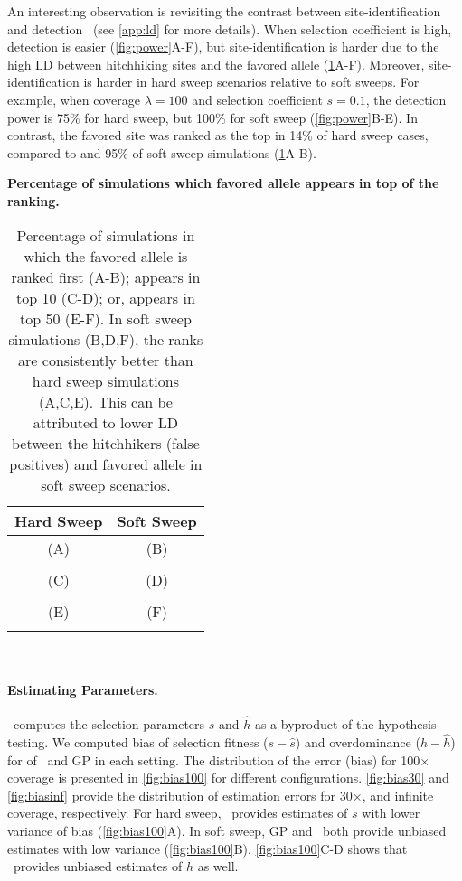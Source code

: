 An interesting observation is revisiting the contrast between 
site-identification
and detection~\cite{long2013massive,tobler2014massive} (see \ref{app:ld} for 
more details). 
When selection 
coefficient is high, detection is easier
(\ref{fig:power}A-F), but site-identification is harder due to
the high LD between hitchhiking sites and the favored allele
(\ref{tab:rank}A-F).  Moreover, site-identification is harder in
hard sweep scenarios relative to soft sweeps. For example, when
coverage $\lambda=100$ and selection coefficient $s=0.1$, the
detection power is 75\% for hard sweep, but 100\% for soft sweep
(\ref{fig:power}B-E). In contrast, the favored site was ranked as
the top in 14\% of hard sweep cases, compared to and 95\% of soft
sweep simulations (\ref{tab:rank}A-B).  

\newcommand*\rot{\rotatebox{-90} }
\begin{table}[H]
	\centering
		\caption{\bf Percentage of simulations which favored allele appears in 
		top of the ranking.}
	\begin{tabular}{c||c}
		 Hard Sweep &Soft Sweep\\
		\hline
		(A) & (B)  \\
		{}
		 &{ }\\
		\hline
		(C)  & (D)  \\
		{}
		& { }\\
		\hline
		(E) & (F) \\
		{}
		&{ }\\
		\hline
	\end{tabular}\\
	\caption*{		Percentage of simulations in which the favored allele is 
	ranked 
	first 
		(A-B); 
		appears in top 10 (C-D); or,  appears in top 50 (E-F). In soft sweep 
		simulations (B,D,F), the ranks are consistently better than 
		hard sweep simulations (A,C,E). This can be attributed to lower LD 
		between the 
		hitchhikers (false positives) and favored allele in soft sweep 
		scenarios.}\label{tab:rank}
\end{table}
 
\paragraph{Estimating Parameters.}
\comale\ computes the selection parameters $\hat{s}$ and $\hat{h}$ as
a byproduct of the hypothesis testing. We computed bias of selection
fitness ($s-\hat{s}$) and overdominance ($h-\hat{h}$) for of \comale\
and GP in each setting. The distribution of the error (bias) for
100$\times$ coverage is presented in \ref{fig:bias100} for
different configurations.
\ref{fig:bias30} and \ref{fig:biasinf} provide the
distribution of estimation errors for 30$\times$, and infinite
coverage, respectively.  For hard sweep, \comale\ provides estimates
of $s$ with lower variance of bias (\ref{fig:bias100}A). In soft
sweep, GP and \comale\ both provide unbiased estimates with low
variance (\ref{fig:bias100}B). \ref{fig:bias100}C-D shows
that \comale\ provides unbiased estimates of $h$ as well.

